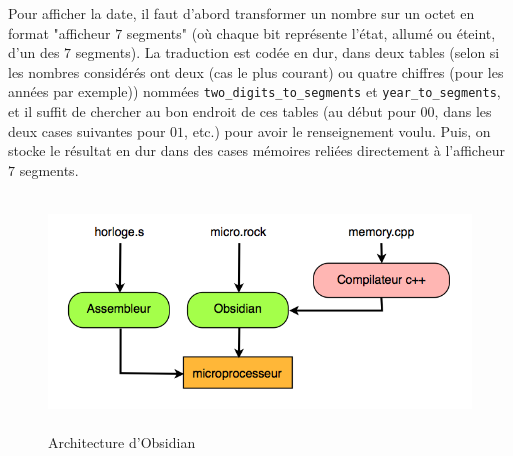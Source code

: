\documentclass[13pt]{article}
\begin{document}
Pour afficher la date, il faut d'abord transformer un nombre sur un octet en
format "afficheur $7$ segments" (où chaque bit représente l'état, allumé ou
éteint, d'un des $7$ segments). La traduction est codée en dur, dans deux tables
(selon si les nombres considérés ont deux (cas le plus courant) ou quatre
chiffres (pour les années par exemple)) nommées \texttt{two\_digits\_to\_segments} et
\texttt{year\_to\_segments}, et il suffit de chercher au bon endroit de ces tables (au
début pour $00$, dans les deux cases suivantes pour $01$, etc.) pour avoir
le renseignement voulu. Puis, on stocke le résultat en dur dans des cases
mémoires reliées directement à l'afficheur $7$ segments.

\begin{figure}[!h]
\centering
\includegraphics[width=13.5cm,height=6.2cm]{exec.png}
\caption{Architecture d'Obsidian}
\label{Architecture d'Obsidian}
\end{figure}
\end{document}
